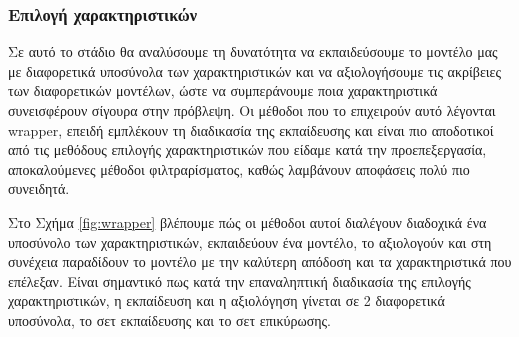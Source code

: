 \subsubsection{Επιλογή χαρακτηριστικών} \label{section:selection}
Σε αυτό το στάδιο θα αναλύσουμε τη δυνατότητα να εκπαιδεύσουμε το μοντέλο μας με διαφορετικά υποσύνολα των χαρακτηριστικών και να αξιολογήσουμε τις ακρίβειες των διαφορετικών μοντέλων, ώστε να συμπεράνουμε ποια χαρακτηριστικά συνεισφέρουν σίγουρα στην πρόβλεψη. Οι μέθοδοι που το επιχειρούν αυτό λέγονται wrapper, επειδή εμπλέκουν  τη διαδικασία της εκπαίδευσης και είναι πιο αποδοτικοί από τις μεθόδους επιλογής χαρακτηριστικών που είδαμε κατά την προεπεξεργασία, αποκαλούμενες μέθοδοι φιλτραρίσματος, καθώς λαμβάνουν αποφάσεις πολύ πιο συνειδητά.

Στο Σχήμα \ref{fig:wrapper} βλέπουμε πώς οι μέθοδοι αυτοί διαλέγουν διαδοχικά ένα υποσύνολο των χαρακτηριστικών, εκπαιδεύουν ένα μοντέλο, το αξιολογούν και στη συνέχεια παραδίδουν το μοντέλο με την καλύτερη απόδοση και τα χαρακτηριστικά που επέλεξαν. Είναι σημαντικό πως κατά την επαναληπτική διαδικασία της επιλογής χαρακτηριστικών, η εκπαίδευση και η αξιολόγηση γίνεται σε 2 διαφορετικά υποσύνολα, το σετ εκπαίδευσης και το σετ επικύρωσης.

